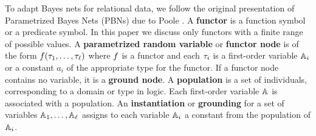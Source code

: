 \documentclass{article}
\begin{document}
To adapt Bayes nets for relational data, we follow the original presentation of Parametrized Bayes Nets (PBNs) due to Poole \citeyear{Poole2003}. 
A \textbf{functor} is a function symbol or a predicate symbol. In this paper we discuss only  functors with a finite range of possible values. 
A \textbf{parametrized random variable} or \textbf{functor node} is  of the form $f(\tau_{1},\ldots,\tau_{\ell})$ where $f$ is a functor 
and each $\tau_{i}$ is a first-order variable $\mathbb{A}_{i}$ or a constant $a_{i}$ of the appropriate type for the functor.
If a functor node contains no variable, it is a \textbf{ground node}. 
A \textbf{population} is a set of individuals, corresponding to a domain or type in logic. Each first-order variable $\mathbb{A}$ is associated with a population.
 An \textbf{instantiation} or \textbf{grounding} 
 for a set of variables $\mathbb{A}_{1},\ldots,\mathbb{A}_{\ell}$ assigns to each variable $\mathbb{A}_{i}$ a constant 
 from the population of $\mathbb{A}_{i}$.
\end{document}
